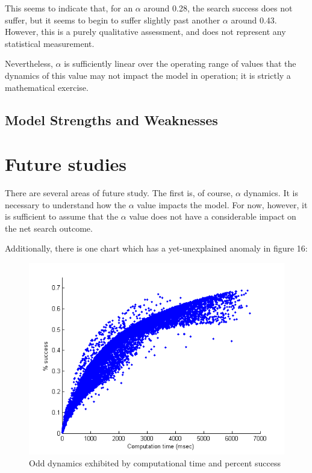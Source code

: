 \documentclass[a4paper]{article}
\begin{document}
This seems to indicate that, for an $\alpha$ around 0.28, the search success does not suffer, but it seems to begin to suffer slightly past another $\alpha$ around 0.43. However, this is a purely qualitative assessment, and does not represent any statistical measurement.

Nevertheless, $\alpha$ is sufficiently linear over the operating range of values that the dynamics of this value may not impact the model in operation; it is strictly a mathematical exercise.

\subsection{Model Strengths and Weaknesses}


\section{Future studies}

There are several areas of future study. The first is, of course, $\alpha$ dynamics. It is necessary to understand how the $\alpha$ value impacts the model. For now, however, it is sufficient to assume that the $\alpha$ value does not have a considerable impact on the net search outcome. 

Additionally, there is one chart which has a yet-unexplained anomaly in figure 16:

\begin{figure}[H]\begin{center}
\includegraphics[scale=0.75]{../Matlab/Images/CompTimePctSuccess.png}
\caption{Odd dynamics exhibited by computational time and percent success}
\end{center}\end{figure}
\end{document}
